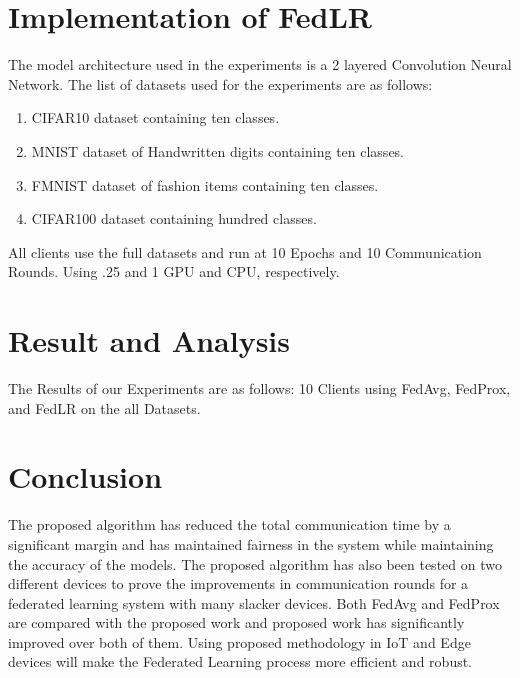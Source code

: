 \documentclass[conference]{IEEEtran}
\begin{document}
\section{Implementation of FedLR}
The model architecture used in the experiments is a 2 layered Convolution Neural Network. The list of datasets used for the experiments are as follows:
\begin{enumerate}
    \item CIFAR10 \cite{cifar10} dataset containing ten classes.
    \item MNIST \cite{lecun1998mnist} dataset of Handwritten digits containing ten classes. 
    \item FMNIST \cite{xiao2017fashionmnistnovelimagedataset} dataset of fashion items containing ten classes.
    \item CIFAR100 \cite{Krizhevsky09learningmultiple} dataset containing hundred classes. 
\end{enumerate}
All clients use the full datasets and run at 10 Epochs and 10 Communication Rounds. Using .25 and 1 GPU and CPU, respectively.
\section{Result and Analysis}
The Results of our Experiments are as follows:
10 Clients using FedAvg, FedProx, and FedLR on the all Datasets. 



\section{Conclusion}
The proposed algorithm has reduced the total communication time by a significant margin and has maintained fairness in the system while maintaining the accuracy of the models. The proposed algorithm has also been tested on two different devices to prove the improvements in communication rounds for a federated learning system with many slacker devices. Both FedAvg and FedProx are compared with the proposed work and proposed work has significantly improved over both of them. Using proposed methodology in IoT and Edge devices will make the Federated Learning process more efficient and robust.


\end{document}
